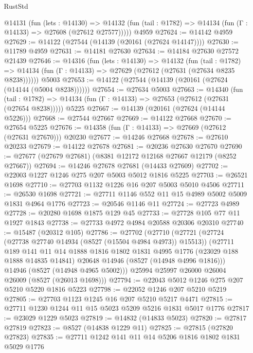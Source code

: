 \begin{lexlean}{RustStd}
\begin{coremodule}
    @14131
      (fun (lets : @14130) =>
      @14132 (fun (tail : @1782) => @14134 (fun (Γ : @14133) => @27608 (@27612 @27577)))))
    @4959
@27624 := @14142 @4959
@27629 := @14122 (@27544 (@14139 (@20161 (@27624 @14147))))
@27630 := @11789 @4959
@27631 := @14181 @27630
@27634 := @14184 @27630 @27572 @21439
@27646 := @14316
    (fun (lets : @14130) =>
    @14132
      (fun (tail : @1782) =>
      @14134 (fun (Γ : @14133) => @27629 (@27612 (@27631 (@27634 @8235 @8238))))))
    @5003
@27653 := @14122 (@27544 (@14139 (@20161 (@27624 (@14144 (@5004 @8238))))))
@27654 := @27634 @5003
@27663 := @14340
    (fun (tail : @1782) => @14134 (fun (Γ : @14133) => @27653 (@27612 (@27631 (@27654 @8238)))))
    @5225
@27667 := @14139 (@20161 (@27624 (@14144 @5226)))
@27668 := @27544 @27667
@27669 := @14122 @27668
@27670 := @27654 @5225
@27676 := @14358 (fun (Γ : @14133) => @27669 (@27612 (@27631 @27670))) @20230
@27677 := @14246 @27668
@27678 := @27610 @20233
@27679 := @14122 @27678
@27681 := @20236 @27630 @27670
@27690 := @27677 (@27679 @27681) (@8381 @12172 @12168 @27667 @12179 (@8252 @27667))
@27694 := @14246 @27678 @27681 (@14433 @27609)
@27702 := @22003 @1227 @1246 @275 @207 @5003 @5012 @1816 @5225
@27703 := @26521 @1698
@27710 := @27703 @1132 @1226 @16 @207 @5003 @5010 @4506
@27711 := @26530 @1698
@27721 := @27711 @1146 @552 @11 @15 @4989 @5002 @5009 @1831 @4964 @1776
@27723 := @20546 @1146 @11
@27724 := @27723 @4989
@27728 := @20280 @1698 @1875 @129 @45
@27733 := @27728 @105 @77 @11 @1927 @1843
@27738 := @27733 @4972 @4984 @20588 @20306 @20310
@27740 := @15487 (@20312 @105)
@27786 := @27702
    (@27710
      (@27721
        (@27724 (@27738 @27740 @14934 (@8527 (@15504 @4984 @4973)) @15513))
        (@27711
          @189
          @141
          @11
          @14
          @1888
          @1816
          @1802
          @1831
          @4995
          @1776
          (@23029 @188 @1888 @14835 @14841)
          @20648
          @14946
          (@8527 (@14948 @4996 @1816)))
        @14946
        (@8527 (@14948 @4965 @5002)))
      @25994
      @25997
      @26000
      @26004
      @26009
      (@8527 (@26013 @1698)))
@27794 := @22043 @5012 @1246 @275 @207 @5210 @5220 @1816 @5223
@27798 := @22052 @1246 @207 @5210 @5219
@27805 := @27703 @1123 @1245 @16 @207 @5210 @5217 @4471
@27815 := @27711 @1230 @1244 @11 @15 @5023 @5209 @5216 @1831 @5017 @1776
@27817 := @23029 @1229 @5023
@27819 := @14832 (@14833 @5023)
@27820 := @27817 @27819
@27823 := @8527 (@14838 @1229 @11)
@27825 := @27815 (@27820 @27823)
@27835 := @27711 @1242 @141 @11 @14 @5206 @1816 @1802 @1831 @5029 @1776

\end{coremodule}
\end{lexlean}
